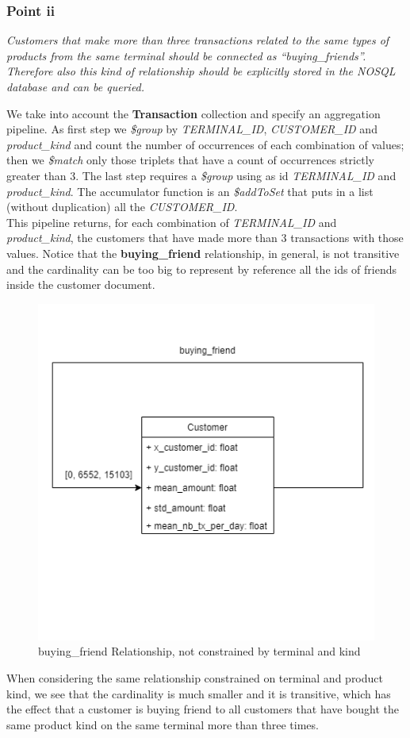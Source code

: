 \documentclass[runningheads]{llncs}
\begin{document}
\subsubsection{Point ii}

\emph{Customers that make more than three transactions related to the same types of products from the same terminal should be connected as “buying\_friends”. Therefore also this kind of relationship should be explicitly stored in the NOSQL database and can be queried.}

\hfill

We take into account the \textbf{Transaction} collection and specify an aggregation pipeline. As first step we \emph{\$group} by \emph{TERMINAL\_ID}, \emph{CUSTOMER\_ID} and \emph{product\_kind} and count the number of occurrences of each combination of values; then we \emph{\$match} only those triplets that have a count of occurrences strictly greater than 3. The last step requires a \emph{\$group} using as id \emph{TERMINAL\_ID} and \emph{product\_kind}. The accumulator function is an \emph{\$addToSet} that puts in a list (without duplication) all the \emph{CUSTOMER\_ID}.
\\
This pipeline returns, for each combination of \emph{TERMINAL\_ID} and \emph{product\_kind}, the customers that have made more than 3 transactions with those values. Notice that the \textbf{buying\_friend} relationship, in general, is not transitive and the cardinality can be too big to represent by reference all the ids of friends inside the customer document.
\\
\begin{figure}[!htb] 
        \centering \includegraphics[width=0.5\columnwidth]{images/buyingFriends_all.png}
        \caption{\label{b_f_all}buying\_friend Relationship, not constrained by terminal and kind}
\end{figure}
When considering the same relationship constrained on terminal and product kind, we see that the cardinality is much smaller and it is transitive, which has the effect that a customer is buying friend to all customers that have bought the same product kind on the same terminal more than three times.\\
\end{document}

